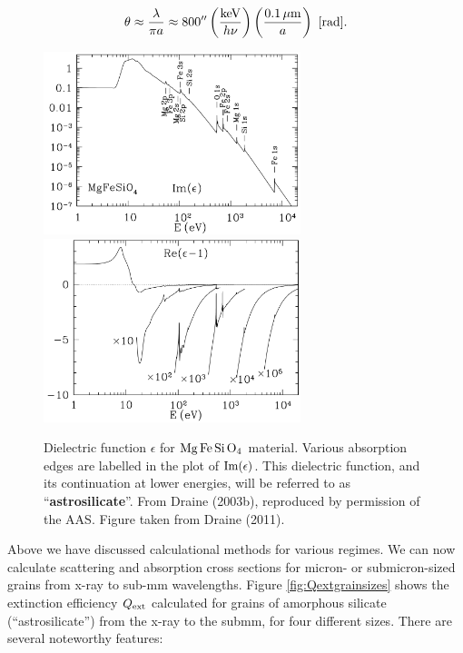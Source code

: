 \documentclass[a4paper,10pt]{article}
\begin{document}
\begin{align*}
    \theta \approx \frac{\lambda}{\pi a} \approx 800'' \left(\frac{{\rm keV}}{h\nu}\right) \left(\frac{0.1\,\mu{\rm m}}{a}\right) ~ [{\rm rad}].
\end{align*}

\begin{figure}[t]
    \centering
    \includegraphics[width=7.5cm]{figures/MgFeSiO4_top.png} \includegraphics[width=7.5cm]{figures/MgFeSiO4_bottom.png}
    \caption{\footnotesize{Dielectric function $\epsilon$ for ${\rm Mg\,Fe\,Si\,O_4}$ material. Various absorption edges are labelled in the plot of ${\rm Im}(\epsilon)$. This dielectric function, and its continuation at lower energies, will be referred to as ``\textbf{astrosilicate}''. From Draine (2003b), reproduced by permission of the AAS. Figure taken from Draine (2011).}}
    \label{fig:MgFeSiO4}
\end{figure}

{\noindent}Above we have discussed calculational methods for various regimes. We can now calculate scattering and absorption cross sections for micron- or submicron-sized grains from x-ray to sub-mm wavelengths. Figure \ref{fig:Qextgrainsizes} shows the extinction efficiency $Q_{\rm ext}$ calculated for grains of amorphous silicate (``astrosilicate'') from the x-ray to the submm, for four different sizes. There are several noteworthy features:
\end{document}

